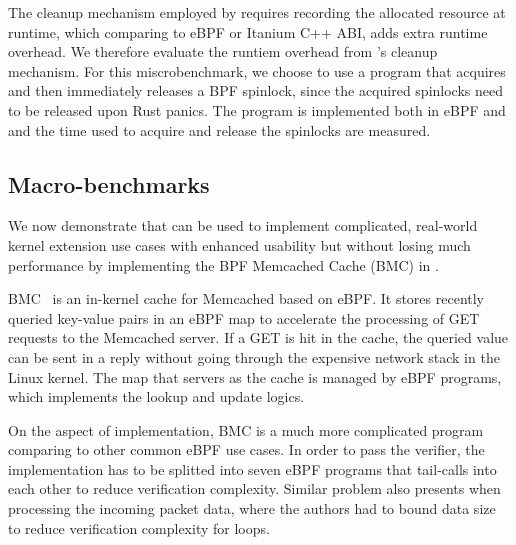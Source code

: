The cleanup mechanism employed by \projname{} requires recording the allocated
    resource at runtime, which comparing to eBPF or Itanium C++ ABI, adds extra
    runtime overhead.
We therefore evaluate the runtiem overhead from \projname{}'s cleanup
    mechanism.
For this miscrobenchmark, we choose to use a program that acquires and then
    immediately releases a BPF spinlock, since the acquired spinlocks need to
    be released upon Rust panics.
The program is implemented both in eBPF and \projname{} and the time used to
    acquire and release the spinlocks are measured.

\subsection{Macro-benchmarks}
\label{eval:macro}
We now demonstrate that \projname{} can be used to implement complicated,
    real-world kernel extension use cases with enhanced usability but without
    losing much performance by implementing the BPF Memcached Cache (BMC) in
    \projname{}.

%

BMC~\cite{BMC} is an in-kernel cache for Memcached based on eBPF.
It stores recently queried key-value pairs in an eBPF map to accelerate the
    processing of GET requests to the Memcached server.
If a GET is hit in the cache, the queried value can be sent in a reply without
    going through the expensive network stack in the Linux kernel.
The map that servers as the cache is managed by eBPF programs, which implements
    the lookup and update logics.

On the aspect of implementation, BMC is a much more complicated program
    comparing to other common eBPF use cases.
In order to pass the verifier, the implementation has to be splitted into seven
    eBPF programs that tail-calls into each other to reduce verification
    complexity.
Similar problem also presents when processing the incoming packet data, where
    the authors had to bound data size to reduce verification complexity for
    loops.

